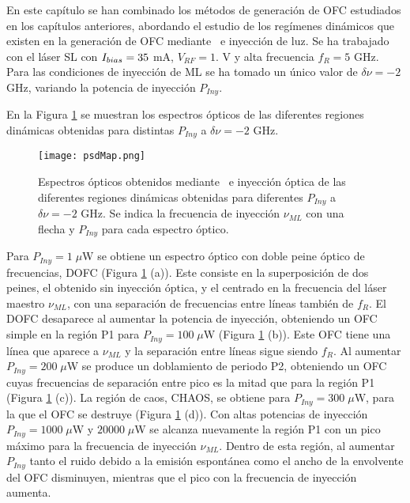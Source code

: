 \graphicspath{{../Graphics/Cpt3-CombInject/}}

En este cap\'itulo se han combinado los m\'etodos de generaci\'on de OFC estudiados en los cap\'itulos anteriores, abordando el estudio de los regímenes din\'amicos que existen en la generaci\'on de OFC mediante \gs\ e inyecci\'on de luz. Se ha trabajado con el l\'aser SL con $I_{bias} = 35$ mA, $V_{RF} = 1.$ V y alta frecuencia $f_R = 5$ GHz. Para las condiciones de inyecci\'on de ML se ha tomado un \'unico valor de $\delta\nu = -2$ GHz, variando la potencia de inyecci\'on $P_{Iny}$.

En la Figura \ref{Img:MapGS-IO} se muestran los espectros \'opticos de las diferentes regiones din\'amicas obtenidas para distintas $P_{Iny}$ a $\delta\nu = -2$ GHz. 

	\begin{figure}[H]
		\centering
		\texttt{[image: psdMap.png]}
		\caption{\label{Img:MapGS-IO}Espectros \'opticos obtenidos mediante \gs\ e inyección \'optica de las diferentes regiones dinámicas obtenidas para diferentes $P_{Iny}$ a $\delta\nu = -2$ GHz. Se indica la frecuencia de inyección $\nu_{ML}$ con una flecha y $P_{Iny}$ para cada espectro \'optico.}
	\end{figure}

Para $P_{Iny} = 1\;\mu$W se obtiene un espectro \'optico con doble peine \'optico de frecuencias, DOFC (Figura \ref{Img:MapGS-IO} (a)). Este consiste en la superposición de dos peines, el obtenido sin inyección óptica, y el centrado en la frecuencia del láser maestro $\nu_{ML}$, con una separación de frecuencias entre líneas también de $f_R$. El DOFC desaparece al aumentar la potencia de inyección, obteniendo un OFC simple en la regi\'on P1 para $P_{Iny} = 100\;\mu$W (Figura \ref{Img:MapGS-IO} (b)). Este OFC tiene una línea que aparece a $\nu_{ML}$ y la separación entre líneas sigue siendo $f_R$. Al aumentar $P_{Iny} = 200 \;\mu$W se produce un doblamiento de periodo P2, obteniendo un OFC cuyas frecuencias de separaci\'on entre pico es la mitad que para la regi\'on P1 (Figura \ref{Img:MapGS-IO} (c)). La región de caos, CHAOS, se obtiene para $P_{Iny} = 300\;\mu$W, para la que el OFC se destruye (Figura \ref{Img:MapGS-IO} (d)). Con altas potencias de inyecci\'on $P_{Iny} = 1000\;\mu$W y $ 20000\;\mu$W se alcanza nuevamente la regi\'on P1 con un pico m\'aximo para la frecuencia de inyecci\'on $\nu_{ML}$. Dentro de esta regi\'on, al aumentar $P_{Iny}$ tanto el ruido debido a la emisi\'on espont\'anea como el ancho de la envolvente del OFC disminuyen, mientras que el pico con la frecuencia de inyecci\'on aumenta.


